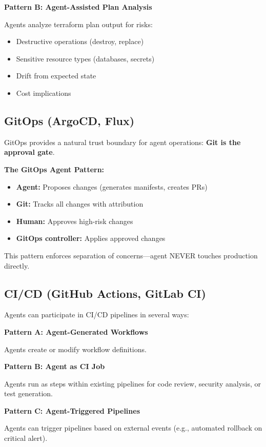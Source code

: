 \textbf{Pattern B: Agent-Assisted Plan Analysis}

Agents analyze terraform plan output for risks:
\begin{itemize}
    \item Destructive operations (destroy, replace)
    \item Sensitive resource types (databases, secrets)
    \item Drift from expected state
    \item Cost implications
\end{itemize}

\subsection{GitOps (ArgoCD, Flux)}
\label{subsec:gitops}

GitOps provides a natural trust boundary for agent operations: \textbf{Git is the approval gate}.

\textbf{The GitOps Agent Pattern:}
\begin{itemize}
    \item \textbf{Agent:} Proposes changes (generates manifests, creates PRs)
    \item \textbf{Git:} Tracks all changes with attribution
    \item \textbf{Human:} Approves high-risk changes
    \item \textbf{GitOps controller:} Applies approved changes
\end{itemize}

This pattern enforces separation of concerns---agent NEVER touches production directly.

\subsection{CI/CD (GitHub Actions, GitLab CI)}
\label{subsec:cicd}

Agents can participate in CI/CD pipelines in several ways:

\textbf{Pattern A: Agent-Generated Workflows}

Agents create or modify workflow definitions.

\textbf{Pattern B: Agent as CI Job}

Agents run as steps within existing pipelines for code review, security analysis, or test generation.

\textbf{Pattern C: Agent-Triggered Pipelines}

Agents can trigger pipelines based on external events (e.g., automated rollback on critical alert).

